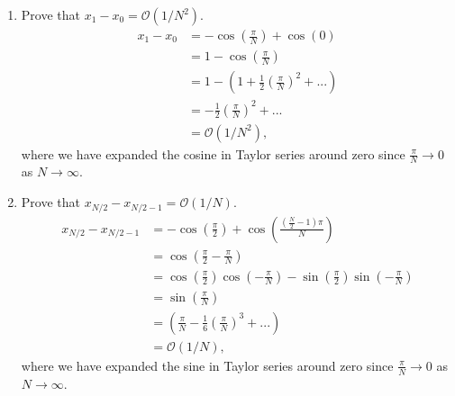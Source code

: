 \begin{enumerate}[label=(\alph*)]
\item Prove that $x_1-x_0=\mathcal{O}(1/N^2)$.
\begin{align*}
x_1-x_0&=-\cos\left(\frac{\pi}{N}\right)+\cos(0)\\
&=1-\cos\left(\frac{\pi}{N}\right)\\
&=1-\left(1+\frac{1}{2}\left(\frac{\pi}{N}\right)^2+...\right)\\
&=-\frac{1}{2}\left(\frac{\pi}{N}\right)^2+...\\
&=\mathcal{O}(1/N^2),
\end{align*}
where we have expanded the cosine in Taylor series around zero since $\frac{\pi}{N}\rightarrow 0$ as $N\rightarrow\infty$.
\item Prove that $x_{N/2}-x_{N/2-1}=\mathcal{O}(1/N)$.
\begin{align*}
x_{N/2}-x_{N/2-1}&=-\cos\left(\frac{\pi}{2}\right)+\cos\left(\frac{\left(\frac{N}{2}-1\right)\pi}{N}\right)\\
&=\cos\left(\frac{\pi}{2}-\frac{\pi}{N}\right)\\
&=\cos\left(\frac{\pi}{2}\right)\cos\left(-\frac{\pi}{N}\right)-\sin\left(\frac{\pi}{2}\right)\sin\left(-\frac{\pi}{N}\right)\\
&=\sin\left(\frac{\pi}{N}\right)\\
&=\left(\frac{\pi}{N}-\frac{1}{6}\left(\frac{\pi}{N}\right)^3+...\right)\\
&=\mathcal{O}(1/N),
\end{align*}
where we have expanded the sine in Taylor series around zero since $\frac{\pi}{N}\rightarrow 0$ as $N\rightarrow\infty$.
\end{enumerate}
